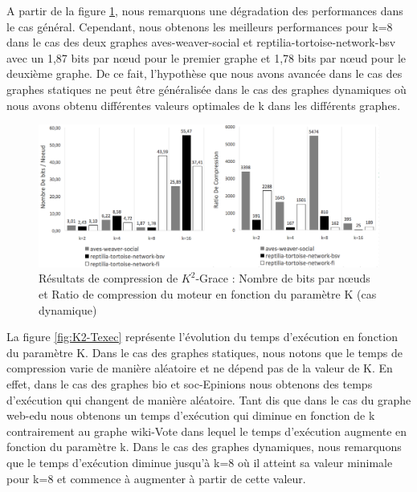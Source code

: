 A partir de la figure \ref{fig:K2-dyn-paraK-NBbits}, nous remarquons une dégradation des performances dans le cas général. Cependant, nous obtenons les meilleurs performances pour k=8 dans le cas des deux graphes aves-weaver-social et reptilia-tortoise-network-bsv avec un 1,87 bits par nœud pour le premier graphe et 1,78 bits par nœud pour le deuxième graphe. De ce fait, l'hypothèse que nous avons avancée dans le cas des graphes statiques ne peut être généralisée dans le cas des graphes dynamiques où nous avons obtenu différentes valeurs optimales de k dans les différents graphes. 
\begin{figure}[H]
	\centering
	\includegraphics[scale=0.38]{ressources/image/ratioik2.png}
	
	\caption{Résultats de compression de $K^2$-Grace : Nombre de bits par nœuds et Ratio de compression  du moteur en fonction du paramètre K (cas dynamique)}
	\label{fig:K2-dyn-paraK-NBbits}
\end{figure}	
	

La figure \ref{fig:K2-Texec} représente l'évolution du temps d'exécution en fonction du paramètre K. Dans le cas des graphes statiques, nous notons que le temps de compression varie de manière aléatoire et ne dépend pas de la valeur de K. En effet, dans le cas des graphes bio et soc-Epinions nous obtenons des temps d'exécution qui changent de manière aléatoire. Tant dis que dans le cas du graphe web-edu nous obtenons un temps d'exécution qui diminue en fonction de k contrairement au graphe wiki-Vote dans lequel le temps d'exécution  augmente en fonction du paramètre k. Dans le cas des graphes dynamiques, nous remarquons que le temps d'exécution diminue jusqu'à k=8 où il atteint sa valeur minimale pour k=8 et commence à augmenter à partir de cette valeur.


